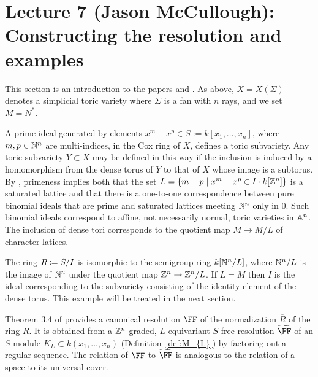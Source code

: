 \documentclass{amsart}
\begin{document}
\fi
\def\tF{{\widetilde \FF}}
\def\BT{{Bondal-Thomsen\ }}

\section{Lecture 7 (Jason McCullough): Constructing the resolution and examples}\label{lec:7-HHL-construction}
This section is an introduction to the papers \cite{BCHS+25} and \cite{BH25}. As above, $X = X(\Sigma)$ denotes a simplicial toric variety where $\Sigma$ is a fan with $n$ rays, and we set $M = N^{*}$. %



A  prime ideal generated by elements $x^m-x^p \in S := k[x_1,\dots, x_n]$, where $m,p\in\NN^n$ are multi-indices, in the 
Cox ring of $X$, defines a toric subvariety.  Any toric subvariety $Y\subset X$ may be defined in this way if the inclusion is
induced by a homomorphism from the dense torus of $Y$ to that of $X$ whose image is a subtorus.
By \cite{ES96}, primeness implies both that
the set $L = \{m-p\mid x^m-x^p\in I \cdot k[\ZZ^n]\}$ is a saturated lattice and  that there is a one-to-one correspondence between pure binomial ideals that are prime and saturated lattices meeting
 $\NN^n$ only in 0. Such binomial ideals correspond to affine, not necessarily normal, toric varieties in $\AA^{n}$. 
 The inclusion of dense tori corresponds to the quotient map $M \to M/L$ of character latices.
 
 The ring $R \ce S/I$ is isomorphic to the semigroup ring $k[\NN^n/L]$, where $\NN^n/L$ is the image of $\NN^n$ under the quotient map $\ZZ^n\rightarrow \ZZ^n/L$.
 If $L = M $ then $I$ is the ideal corresponding to the subvariety consisting of the identity element of the dense torus. This example will be treated in the next section.


Theorem 3.4 of \cite{BCHS+25} provides a canonical  resolution $\FF$ of the normalization $\overline R$
of the ring $R$. It is obtained from a $\ZZ^{n}$-graded, $L$-equivariant $S$-free resolution $\tF$ of 
an $S$-module $K_L\subset k(x_{1}, \dots, x_{n})$ (Definition~\ref{def:M_{L}}) by factoring out a regular sequence.
The relation of $\FF$ to $\tF$ is analogous to the relation of a space to its universal cover.
\end{document}
